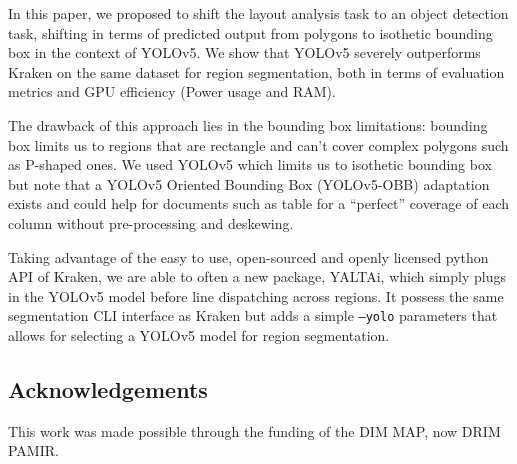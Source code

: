 \documentclass{jdmdh}
\begin{document}
In this paper, we proposed to shift the layout analysis task to an object detection task, shifting in terms of predicted output from polygons to isothetic bounding box in the context of YOLOv5. We show that YOLOv5 severely outperforms Kraken on the same dataset for region segmentation, both in terms of evaluation metrics and GPU efficiency (Power usage and RAM).

The drawback of this approach lies in the bounding box limitations: bounding box limits us to regions that are rectangle and can't cover complex polygons such as P-shaped ones. We used YOLOv5 which limits us to isothetic bounding box but note that a YOLOv5 Oriented Bounding Box (YOLOv5-OBB) adaptation exists and could help for documents such as table for a ``perfect'' coverage of each column without pre-processing and deskewing.

Taking advantage of the easy to use, open-sourced and openly licensed python API of Kraken, we are able to often a new package, YALTAi, which simply plugs in the YOLOv5 model before line dispatching across regions. It possess the same segmentation CLI interface as Kraken but adds a simple \texttt{--yolo} parameters that allows for selecting a YOLOv5 model for region segmentation.

\subsection{Acknowledgements}

This work was made possible through the funding of the DIM MAP, now DRIM PAMIR.



\end{document}
